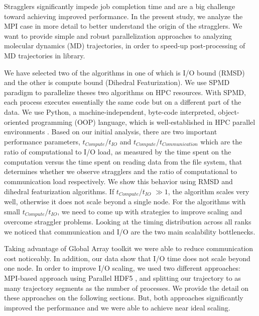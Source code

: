 Stragglers significantly impede job completion time and are a big challenge toward achieving improved performance.
In the present study, we analyze the MPI case in more detail to better understand the origin of the stragglers.
We want to provide simple and robust parallelization approaches to analyzing molecular dynamics (MD) trajectories, in order to speed-up post-processing of MD trajectories in  library. 

We have selected two of the algorithms in  one of which is I/O bound (RMSD) and the other is compute bound (Dihedral Featurization).
We use SPMD paradigm to parallelize theses two algorithms on HPC resources.
With SPMD, each process executes essentially the same code but on a different part of the data. 
We use Python, a machine-independent, byte-code interpreted, object-oriented programming (OOP) language, which is well-established in HPC parallel environments \cite{GAiN}. 
Based on our initial analysis, there are two important performance parameters,  $t_{Compute}$/$t_{IO}$ and $t_{Compute}$/$t_{Communication}$ which are the ratio of computational to I/O load, as measured by the time spent on the computation versus the time spent on reading data from the file system, that determines whether we observe stragglers and the ratio of computational to communication load respectively.
We show this behavior using RMSD and dihedral featurization algorithms.
If $t_{Compute}$/$t_{IO}$  $\gg 1$, the algorithm scales very well, otherwise it does not scale beyond a single node. 
For the algorithms with small $t_{Compute}$/$t_{IO}$, we need to come up with strategies to improve scaling and overcome straggler problems.
Looking at the timing distribution across all ranks we noticed that communication and I/O are the two main scalability bottlenecks.

Taking advantage of Global Array toolkit we were able to reduce communication cost noticeably.
In addition, our data show that I/O time does not scale beyond one node. 
In order to improve I/O scaling, we used two different approaches: MPI-based approach using Parallel HDF5 \cite{pythonhdf5}, and splitting our trajectory to as many trajectory segments as the number of processes. 
We provide the detail on these approaches on the following sections.
But, both approaches significantly improved the performance and we were able to achieve near ideal scaling.